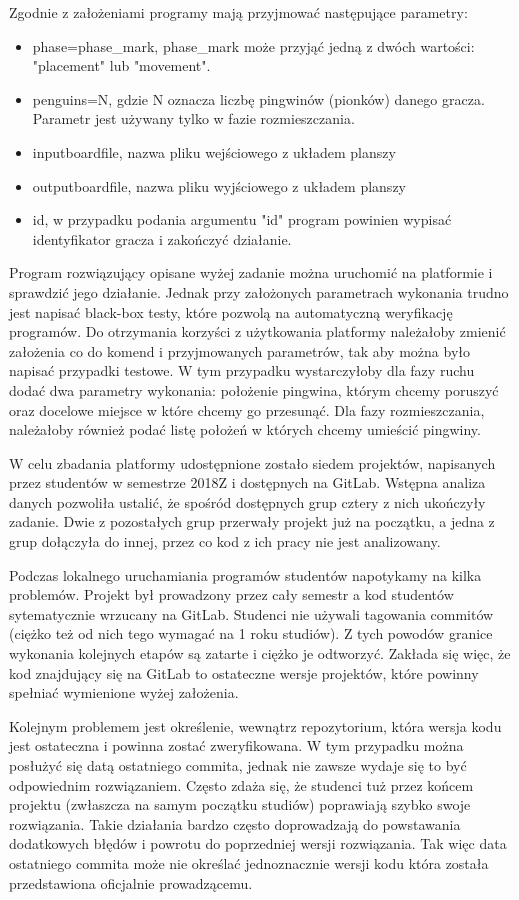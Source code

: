 Zgodnie z założeniami programy mają przyjmować następujące parametry:
\begin{itemize}
    \item phase=phase\_mark, phase\_mark może przyjąć jedną z dwóch wartości: "placement" lub "movement".
    \item penguins=N, gdzie N oznacza liczbę pingwinów (pionków) danego gracza.
    Parametr jest używany tylko w fazie rozmieszczania.
    \item inputboardfile, nazwa pliku wejściowego z układem planszy
    \item outputboardfile, nazwa pliku wyjściowego z układem planszy
    \item id, w przypadku podania argumentu "id" program powinien wypisać identyfikator gracza i zakończyć działanie.
\end{itemize}

Program rozwiązujący opisane wyżej zadanie można uruchomić na platformie i sprawdzić jego działanie.
Jednak przy założonych parametrach wykonania trudno jest napisać black-box testy, które pozwolą na automatyczną weryfikację programów.
Do otrzymania korzyści z użytkowania platformy należałoby zmienić założenia co do komend i przyjmowanych parametrów, tak aby można było napisać przypadki testowe.
W tym przypadku wystarczyłoby dla fazy ruchu dodać dwa parametry wykonania: położenie pingwina, którym chcemy poruszyć oraz docelowe miejsce w które chcemy go przesunąć.
Dla fazy rozmieszczania, należałoby również podać listę położeń w których chcemy umieścić pingwiny.

W celu zbadania platformy udostępnione zostało siedem projektów, napisanych przez studentów w semestrze 2018Z i dostępnych na GitLab.
Wstępna analiza danych pozwoliła ustalić, że spośród dostępnych grup cztery z nich ukończyły zadanie.
Dwie z pozostałych grup przerwały projekt już na początku, a jedna z grup dołączyła do innej, przez co kod z ich pracy nie jest analizowany.

Podczas lokalnego uruchamiania programów studentów napotykamy na kilka problemów.
Projekt był prowadzony przez cały semestr a kod studentów sytematycznie wrzucany na GitLab.
Studenci nie używali tagowania commitów (ciężko też od nich tego wymagać na 1 roku studiów).
Z tych powodów granice wykonania kolejnych etapów są zatarte i ciężko je odtworzyć.
Zakłada się więc, że kod znajdujący się na GitLab to ostateczne wersje projektów, które powinny spełniać wymienione wyżej założenia.

Kolejnym problemem jest określenie, wewnątrz repozytorium, która wersja kodu jest ostateczna i powinna zostać zweryfikowana.
W tym przypadku można posłużyć się datą ostatniego commita, jednak nie zawsze wydaje się to być odpowiednim rozwiązaniem.
Często zdaża się, że studenci tuż przez końcem projektu (zwłaszcza na samym początku studiów) poprawiają szybko swoje rozwiązania.
Takie działania bardzo często doprowadzają do powstawania dodatkowych błędów i powrotu do poprzedniej wersji rozwiązania.
Tak więc data ostatniego commita może nie określać jednoznacznie wersji kodu która została przedstawiona oficjalnie prowadzącemu.

